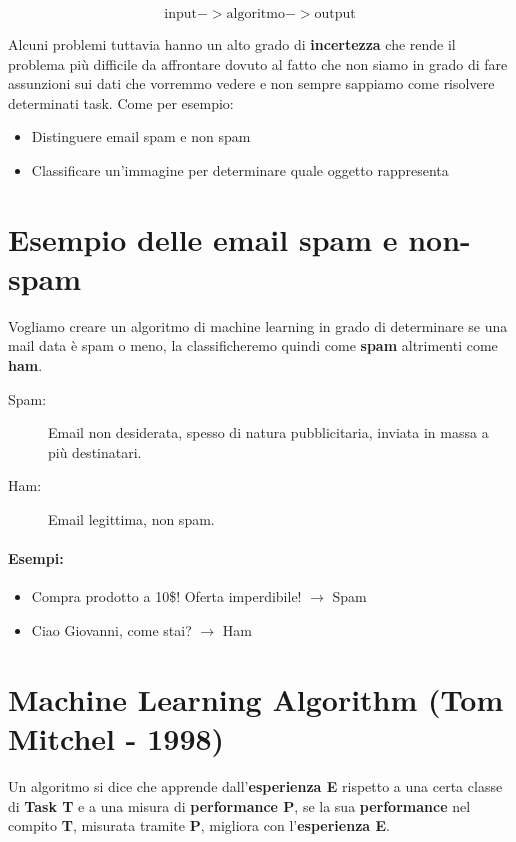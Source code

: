 \[
\text{input} -> \text{algoritmo} -> \text{output}
\]

Alcuni problemi tuttavia hanno un alto grado di \textbf{incertezza} che rende il problema più difficile da affrontare dovuto al fatto che non siamo in grado di fare assunzioni sui dati che vorremmo vedere e non sempre sappiamo come risolvere determinati task. Come per esempio:

\begin{itemize}
\item Distinguere email spam e non spam
\item Classificare un'immagine per determinare quale oggetto rappresenta
\end{itemize}

\section{Esempio delle email spam e non-spam}

Vogliamo creare un algoritmo di machine learning in grado di determinare se una mail data è spam o meno, la classificheremo quindi come \textbf{spam} altrimenti come \textbf{ham}.

\begin{description}
    \item[Spam:] Email non desiderata, spesso di natura pubblicitaria, inviata in massa a più destinatari.
    \item[Ham:] Email legittima, non spam.
\end{description}

\paragraph{Esempi:}

\begin{itemize}
    \item Compra prodotto a 10\$! Oferta imperdibile! $\rightarrow$ Spam
    \item Ciao Giovanni, come stai? $\rightarrow$ Ham
\end{itemize}

\section{Machine Learning Algorithm (Tom Mitchel - 1998)}

Un algoritmo si dice che apprende dall'\textbf{esperienza E} rispetto a una certa classe di \textbf{Task T} e a una misura di \textbf{performance P}, se la sua \textbf{performance} nel compito \textbf{T}, misurata tramite \textbf{P}, migliora con l’\textbf{esperienza E}.

